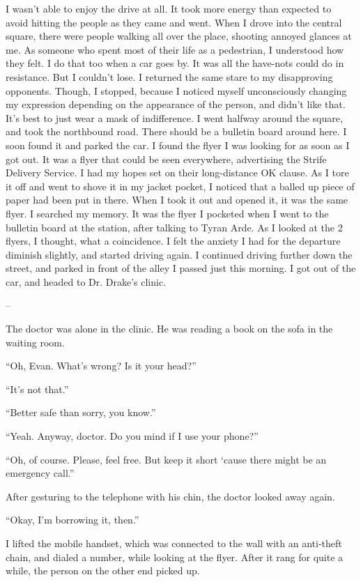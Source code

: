 \documentclass[oneside]{book}
\begin{document}
I wasn’t able to enjoy the drive at all. It took more energy than expected to avoid hitting the people as they came and went. When I drove into the central square, there were people walking all over the place, shooting annoyed glances at me. As someone who spent most of their life as a pedestrian, I understood how they felt. I do that too when a car goes by. It was all the have-nots could do in resistance. But I couldn’t lose. I returned the same stare to my disapproving opponents. Though, I stopped, because I noticed myself unconsciously changing my expression depending on the appearance of the person, and didn’t like that. It’s best to just wear a mask of indifference. I went halfway around the square, and took the northbound road. There should be a bulletin board around here. I soon found it and parked the car. I found the flyer I was looking for as soon as I got out. It was a flyer that could be seen everywhere, advertising the Strife Delivery Service. I had my hopes set on their long-distance OK clause. As I tore it off and went to shove it in my jacket pocket, I noticed that a balled up piece of paper had been put in there. When I took it out and opened it, it was the same flyer. I searched my memory. It was the flyer I pocketed when I went to the bulletin board at the station, after talking to Tyran Arde. As I looked at the 2 flyers, I thought, what a coincidence. I felt the anxiety I had for the departure diminish slightly, and started driving again. I continued driving further down the street, and parked in front of the alley I passed just this morning. I got out of the car, and headed to Dr. Drake’s clinic.

–

The doctor was alone in the clinic. He was reading a book on the sofa in the waiting room.

“Oh, Evan. What’s wrong? Is it your head?”

“It’s not that.”

“Better safe than sorry, you know.”

“Yeah. Anyway, doctor. Do you mind if I use your phone?”

“Oh, of course. Please, feel free. But keep it short ‘cause there might be an emergency call.”

After gesturing to the telephone with his chin, the doctor looked away again.

“Okay, I’m borrowing it, then.”

I lifted the mobile handset, which was connected to the wall with an anti-theft chain, and dialed a number, while looking at the flyer. After it rang for quite a while, the person on the other end picked up.
\end{document}
